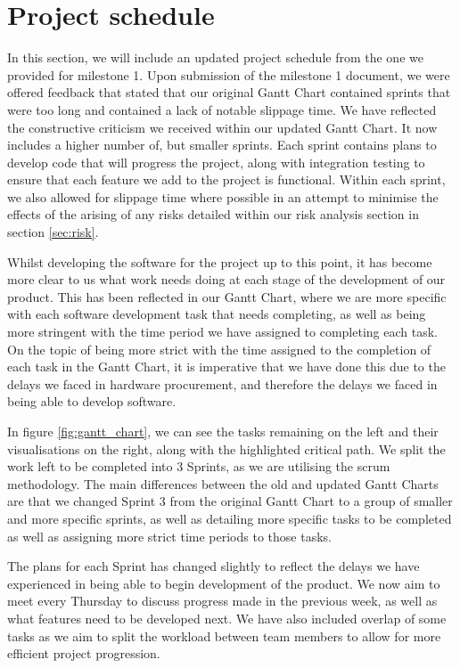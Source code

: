 \chapter{Project schedule}
\label{chap:schedule}

In this section, we will include an updated project schedule from the one we provided for milestone 1. Upon submission of the milestone 1 document, we were offered feedback that stated that our original Gantt Chart contained sprints that were too long and contained a lack of notable slippage time. We have reflected the constructive criticism we received within our updated Gantt Chart. It now includes a higher number of, but smaller sprints. Each sprint contains plans to develop code that will progress the project, along with integration testing to ensure that each feature we add to the project is functional. Within each sprint, we also allowed for slippage time where possible in an attempt to minimise the effects of the arising of any risks detailed within our risk analysis section in section \ref{sec:risk}.

Whilst developing the software for the project up to this point, it has become more clear to us what work needs doing at each stage of the development of our product. This has been reflected in our Gantt Chart, where we are more specific with each software development task that needs completing, as well as being more stringent with the time period we have assigned to completing each task. On the topic of being more strict with the time assigned to the completion of each task in the Gantt Chart, it is imperative that we have done this due to the delays we faced in hardware procurement, and therefore the delays we faced in being able to develop software. 

In figure \ref{fig:gantt_chart}, we can see the tasks remaining on the left and their visualisations on the right, along with the highlighted critical path. We split the work left to be completed into 3 Sprints, as we are utilising the scrum methodology. The main differences between the old and updated Gantt Charts are that we changed Sprint 3 from the original Gantt Chart to a group of smaller and more specific sprints, as well as detailing more specific tasks to be completed as well as assigning more strict time periods to those tasks. 

The plans for each Sprint has changed slightly to reflect the delays we have experienced in being able to begin development of the product. We now aim to meet every Thursday to discuss progress made in the previous week, as well as what features need to be developed next. We have also included overlap of some tasks as we aim to split the workload between team members to allow for more efficient project progression.


